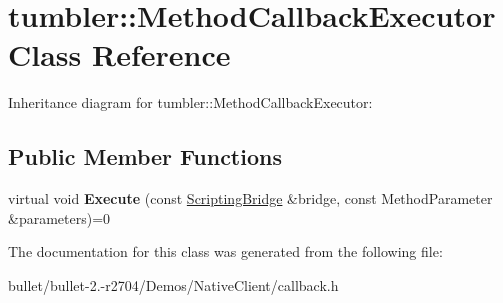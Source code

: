 \hypertarget{classtumbler_1_1_method_callback_executor}{\section{tumbler\+:\+:Method\+Callback\+Executor Class Reference}
\label{classtumbler_1_1_method_callback_executor}
}


Inheritance diagram for tumbler\+:\+:Method\+Callback\+Executor\+:
\subsection*{Public Member Functions}
\begin{DoxyCompactItemize}
\item 
\hypertarget{classtumbler_1_1_method_callback_executor_a3ef5cd11d27fc10b9a1739bab00715a8}{virtual void {\bfseries Execute} (const \hyperlink{classtumbler_1_1_scripting_bridge}{Scripting\+Bridge} \&bridge, const Method\+Parameter \&parameters)=0}\label{classtumbler_1_1_method_callback_executor_a3ef5cd11d27fc10b9a1739bab00715a8}

\end{DoxyCompactItemize}


The documentation for this class was generated from the following file\+:\begin{DoxyCompactItemize}
\item 
bullet/bullet-\/2.-\/r2704/\+Demos/\+Native\+Client/callback.\+h\end{DoxyCompactItemize}
